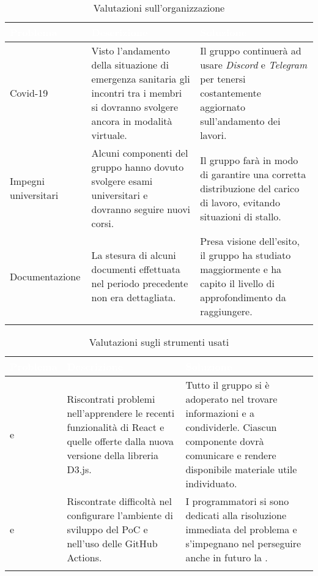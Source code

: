 \begin{itemize}
\renewcommand{\arraystretch}{1.5}
\centering
\begin{longtable}{C{3cm} C{6cm} C{6cm}}
\textcolor{white}{\textbf{Problema}} &
\textcolor{white}{\textbf{Descrizione}} &	
\textcolor{white}{\textbf{Soluzione}} \\	
\endhead

Covid-19 &
Visto l'andamento della situazione di emergenza sanitaria gli incontri tra i membri si dovranno svolgere ancora in modalità virtuale.&
Il gruppo continuerà ad usare \textit{Discord} e \textit{Telegram} per tenersi costantemente aggiornato sull'andamento dei lavori. \\

Impegni universitari & 
Alcuni componenti del gruppo hanno dovuto svolgere esami universitari e dovranno seguire nuovi corsi. &
Il gruppo farà in modo di garantire una corretta distribuzione del carico di lavoro, evitando situazioni di stallo. \\

Documentazione & 
La stesura di alcuni documenti effettuata nel periodo precedente non era dettagliata. &
Presa visione dell'esito, il gruppo ha studiato maggiormente e ha capito il livello di approfondimento da raggiungere. \\

 \caption{Valutazioni sull'organizzazione}
\end{longtable}

\renewcommand{\arraystretch}{1.5}
\centering
\begin{longtable}{C{2.5cm} C{6cm} C{5cm}}
\textcolor{white}{\textbf{Problema}} &
\textcolor{white}{\textbf{Descrizione}} &	
\textcolor{white}{\textbf{Soluzione}} \\	
\endhead

 e  & 
Riscontrati problemi nell'apprendere le recenti funzionalità di React e quelle offerte dalla nuova versione della libreria D3.js. &
Tutto il gruppo si è adoperato nel trovare informazioni e a condividerle. Ciascun componente dovrà comunicare e rendere disponibile materiale utile individuato.  \\

 e  & 
Riscontrate difficoltà nel configurare l'ambiente di sviluppo del PoC e nell'uso delle GitHub Actions. &
I programmatori si sono dedicati alla risoluzione immediata del problema e s'impegnano nel perseguire anche in futuro la .  \\

 \caption{Valutazioni sugli strumenti usati}
\end{longtable}

\end{itemize}

